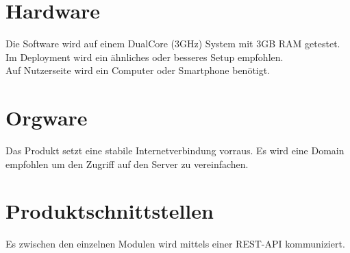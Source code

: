 \section{Hardware}
Die Software wird auf einem DualCore (3GHz) System mit 3GB RAM getestet. Im Deployment wird ein ähnliches oder besseres Setup empfohlen.\\

Auf Nutzerseite wird ein Computer oder Smartphone benötigt. 
\section{Orgware}

Das Produkt setzt eine stabile Internetverbindung vorraus. Es wird eine Domain empfohlen um den Zugriff auf den Server zu vereinfachen.

\section{Produktschnittstellen}
Es zwischen den einzelnen Modulen wird mittels einer REST-API kommuniziert.
